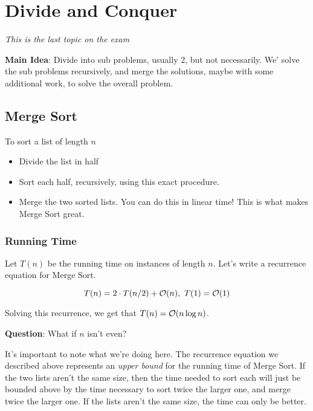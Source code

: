 \documentclass[12pt]{article}
\begin{document}
  \section{Divide and Conquer}
  {\it This is the last topic on the exam}

  {\bf Main Idea}: Divide into sub problems, usually 2, but not necessarily. We'
  solve the sub problems recursively, and merge the solutions, maybe with some
  additional work, to solve the overall problem.

  \subsection{Merge Sort}

  To sort a list of length $n$
  \begin{itemize}
    \item Divide the list in half
    \item Sort each half, recursively, using this exact procedure.
    \item Merge the two sorted lists. You can do this in linear time! This is what makes
      Merge Sort great.
  \end{itemize}

  \subsubsection{Running Time}
  
  Let $T(n)$ be the running time on instances of length $n$. Let's write a
  recurrence equation for Merge Sort.

  \[
    T(n) = 2 \cdot T(n / 2) + \mathcal O(n), \, \, T(1) = \mathcal O(1)
  \]


  Solving this recurrence, we get that $T(n) = \mathcal O(n \log n)$.

  {\bf Question}: What if $n$ isn't even?

  It's important to note what we're doing here. The recurrence equation we
  described above represents an {\it upper bound} for the running time of Merge
  Sort. If the two lists aren't the same size, then the time needed to sort each
  will just be bounded above by the time necessary to sort twice the larger one,
  and merge twice the larger one. If the lists aren't the same size, the time
  can only be better.
\end{document}
